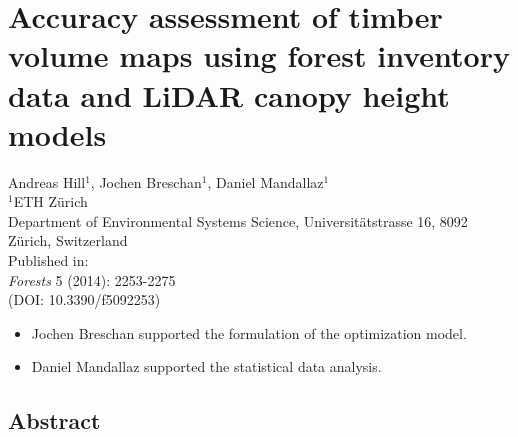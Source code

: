 \chapter{Accuracy assessment of timber volume maps using forest inventory data and LiDAR canopy height models}
\label{chap:regmod}
{\large Andreas Hill$^1$, Jochen Breschan$^1$, Daniel Mandallaz$^1$}\\

\vspace{3cm}
\noindent
$^1$ETH Z\"urich\\Department of Environmental Systems Science, Universit\"atstrasse 16, 8092 Z\"urich, Switzerland \\

\vspace{\fill}
\noindent
Published in:\\
\textit{Forests} 5 (2014): 2253-2275\\
(DOI: 10.3390/f5092253)

\newpage
\thispagestyle{plain}
\renewcommand{\labelitemi}{--}
\begin{itemize}
	\item Jochen Breschan supported the formulation of the optimization model.
	\item Daniel Mandallaz supported the statistical data analysis.
\end{itemize}

\clearpage

\clearpage
\section*{Abstract}
\label{chap:regmod:Abstract}


